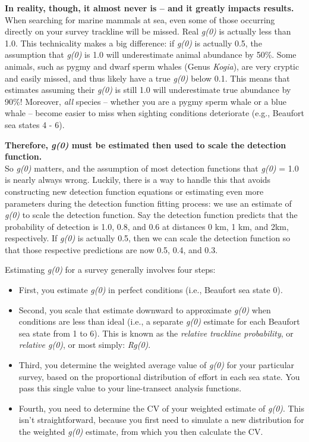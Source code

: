 \documentclass[
]{book}
\begin{document}
\textbf{In reality, though, it almost never is -- and it greatly impacts results.}\\
When searching for marine mammals at sea, even some of those occurring directly on your survey trackline will be missed. Real \emph{g(0)} is actually less than 1.0. This technicality makes a big difference: if \emph{g(0)} is actually 0.5, the assumption that \emph{g(0)} is 1.0 will underestimate animal abundance by 50\%. Some animals, such as pygmy and dwarf sperm whales (Genus \emph{Kogia}), are very cryptic and easily missed, and thus likely have a true \emph{g(0)} below 0.1. This means that estimates assuming their \emph{g(0)} is still 1.0 will underestimate true abundance by 90\%! Moreover, \emph{all} species -- whether you are a pygmy sperm whale or a blue whale -- become easier to miss when sighting conditions deteriorate (e.g., Beaufort sea states 4 - 6).

\textbf{Therefore, \emph{g(0)} must be estimated then used to scale the detection function.}\\
So \emph{g(0)} matters, and the assumption of most detection functions that \emph{g(0)} = 1.0 is nearly always wrong. Luckily, there is a way to handle this that avoids constructing new detection function equations or estimating even more parameters during the detection function fitting process: we use an estimate of \emph{g(0)} to scale the detection function. Say the detection function predicts that the probability of detection is 1.0, 0.8, and 0.6 at distances 0 km, 1 km, and 2km, respectively. If \emph{g(0)} is actually 0.5, then we can scale the detection function so that those respective predictions are now 0.5, 0.4, and 0.3.

Estimating \emph{g(0)} for a survey generally involves four steps:

\begin{itemize}
\item
  First, you estimate \emph{g(0)} in perfect conditions (i.e., Beaufort sea state 0).
\item
  Second, you scale that estimate downward to approximate \emph{g(0)} when conditions are less than ideal (i.e., a separate \emph{g(0)} estimate for each Beaufort sea state from 1 to 6). This is known as the \emph{relative trackline probability}, or \emph{relative g(0)}, or most simply: \emph{Rg(0)}.
\item
  Third, you determine the weighted average value of \emph{g(0)} for your particular survey, based on the proportional distribution of effort in each sea state. You pass this single value to your line-transect analysis functions.
\item
  Fourth, you need to determine the CV of your weighted estimate of \emph{g(0)}. This isn't straightforward, because you first need to simulate a new distribution for the weighted \emph{g(0)} estimate, from which you then calculate the CV.
\end{itemize}
\end{document}
